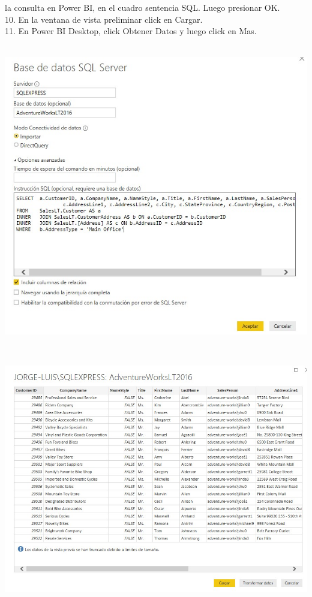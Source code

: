\begin{flushleft}
\begin{itemize}
la consulta en Power BI, en el cuadro sentencia SQL. Luego presionar OK.\\
10. En la ventana de vista preliminar click en Cargar.\\
11. En Power BI Desktop, click Obtener Datos y luego click en Mas.\\
\textbf{ }\\
\begin{center}
	\includegraphics[width=15cm]{./Imagenes/image4} 
	\end{center}
\textbf{ }\\
\begin{center}
	\includegraphics[width=16cm]{./Imagenes/image5} 

\end{center}
\end{itemize}
\end{flushleft}
